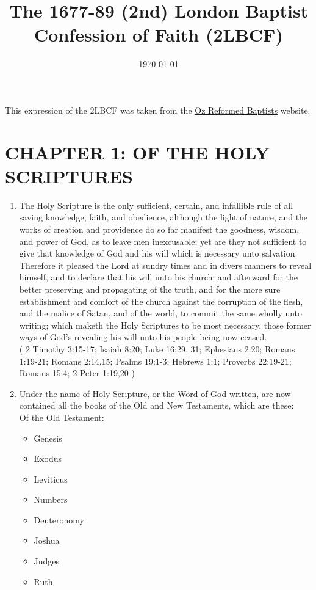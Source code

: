 \documentclass[12pt,a4paper]{book}
\title{The 1677-89 (2nd) London Baptist Confession of Faith (2LBCF)}
\date{\today}%
\begin{document}
\maketitle

This expression of the 2LBCF was taken from the \href{http://ozreformedbaptist.org/the-167789-lbcf/}{Oz Reformed Baptists} website.

\tableofcontents

\chapter{CHAPTER 1: OF THE HOLY SCRIPTURES}
\label{ch-scrip}
\begin{enumerate}
\item The Holy Scripture is the only sufficient, certain, and infallible rule of all saving knowledge, faith, and obedience, although the light of nature, and the works of creation and providence do so far manifest the goodness, wisdom, and power of God, as to leave men inexcusable; yet are they not sufficient to give that knowledge of God and his will which is necessary unto salvation. Therefore it pleased the Lord at sundry times and in divers manners to reveal himself, and to declare that his will unto his church; and afterward for the better preserving and propagating of the truth, and for the more sure establishment and comfort of the church against the corruption of the flesh, and the malice of Satan, and of the world, to commit the same wholly unto writing; which maketh the Holy Scriptures to be most necessary, those former ways of God's revealing his will unto his people being now ceased.\\
( 2 Timothy 3:15-17; Isaiah 8:20; Luke 16:29, 31; Ephesians 2:20; Romans 1:19-21; Romans 2:14,15; Psalms 19:1-3; Hebrews 1:1; Proverbs 22:19-21; Romans 15:4; 2 Peter 1:19,20 )
\item Under the name of Holy Scripture, or the Word of God written, are now contained all the books of the Old and New Testaments, which are these:\\
Of the Old Testament:
\begin{itemize}
\item Genesis
\item Exodus
\item Leviticus
\item Numbers
\item Deuteronomy
\item Joshua
\item Judges
\item Ruth

\end{itemize}
\end{enumerate}
\end{document}
